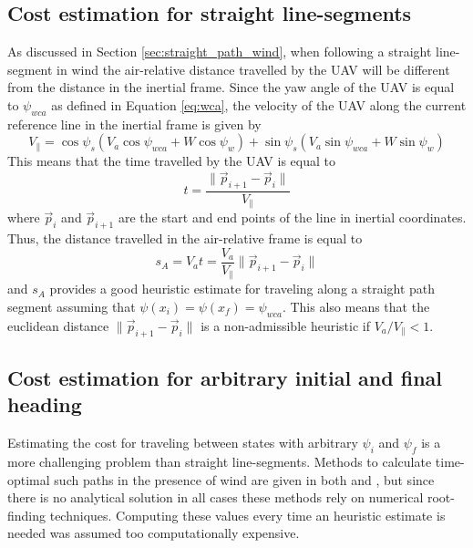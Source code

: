 \subsection{Cost estimation for straight line-segments}\label{sec:straight_path_heuristic}
As discussed in Section \ref{sec:straight_path_wind}, when following a straight line-segment in wind the air-relative 
distance travelled by the UAV will be different from the distance in the inertial frame. Since the yaw angle of the UAV is 
equal to $\psi_{wca}$ as defined in Equation \eqref{eq:wca}, the velocity of the UAV along the current reference line in the inertial frame is given by 
\begin{equation}
    V_{\parallel}=\cos\psi_s(V_a\cos\psi_{wca}+W\cos\psi_w) + \sin\psi_s(V_a\sin\psi_{wca}+W\sin\psi_w)
\end{equation}
This means that the time travelled by the UAV is equal to 
\begin{equation}
    t=\frac{\|\vec{p}_{i+1}-\vec{p}_i\|}{V_\parallel}
\end{equation}
where $\vec{p}_{i}$ and $\vec{p}_{i+1}$ are the start and end points of the line in inertial coordinates. Thus, the distance 
travelled in the air-relative frame is equal to 
\begin{equation}
    s_A=V_at=\frac{V_a}{V_\parallel}\|\vec{p}_{i+1}-\vec{p}_{i}\|
\end{equation}
and $s_A$ provides a good heuristic estimate for traveling along a straight path segment assuming that $\psi(x_i)=\psi(x_f)=\psi_{wca}$.
This also means that the euclidean distance $\|\vec{p}_{i+1}-\vec{p}_{i}\|$ is a non-admissible heuristic if 
$V_a/V_\parallel<1$.

\subsection{Cost estimation for arbitrary initial and final heading}
Estimating the cost for traveling between states with arbitrary $\psi_i$ and $\psi_f$ is a more challenging problem than straight line-segments.
Methods to calculate time-optimal such paths in the presence of wind are given in both \cite{optimal_path_target} and \cite{optimal_path_trochoidal}, 
but since there is no analytical solution in all cases these methods rely on numerical root-finding techniques.
Computing these values every time an heuristic estimate is needed was assumed too computationally expensive.

